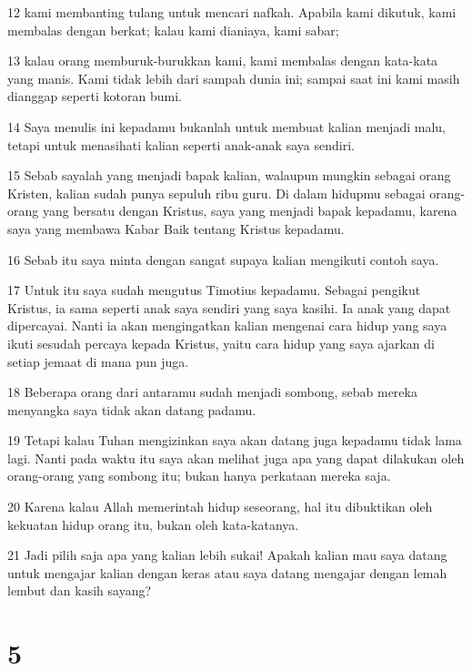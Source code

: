\par 12 kami membanting tulang untuk mencari nafkah. Apabila kami dikutuk, kami membalas dengan berkat; kalau kami dianiaya, kami sabar;
\par 13 kalau orang memburuk-burukkan kami, kami membalas dengan kata-kata yang manis. Kami tidak lebih dari sampah dunia ini; sampai saat ini kami masih dianggap seperti kotoran bumi.
\par 14 Saya menulis ini kepadamu bukanlah untuk membuat kalian menjadi malu, tetapi untuk menasihati kalian seperti anak-anak saya sendiri.
\par 15 Sebab sayalah yang menjadi bapak kalian, walaupun mungkin sebagai orang Kristen, kalian sudah punya sepuluh ribu guru. Di dalam hidupmu sebagai orang-orang yang bersatu dengan Kristus, saya yang menjadi bapak kepadamu, karena saya yang membawa Kabar Baik tentang Kristus kepadamu.
\par 16 Sebab itu saya minta dengan sangat supaya kalian mengikuti contoh saya.
\par 17 Untuk itu saya sudah mengutus Timotius kepadamu. Sebagai pengikut Kristus, ia sama seperti anak saya sendiri yang saya kasihi. Ia anak yang dapat dipercayai. Nanti ia akan mengingatkan kalian mengenai cara hidup yang saya ikuti sesudah percaya kepada Kristus, yaitu cara hidup yang saya ajarkan di setiap jemaat di mana pun juga.
\par 18 Beberapa orang dari antaramu sudah menjadi sombong, sebab mereka menyangka saya tidak akan datang padamu.
\par 19 Tetapi kalau Tuhan mengizinkan saya akan datang juga kepadamu tidak lama lagi. Nanti pada waktu itu saya akan melihat juga apa yang dapat dilakukan oleh orang-orang yang sombong itu; bukan hanya perkataan mereka saja.
\par 20 Karena kalau Allah memerintah hidup seseorang, hal itu dibuktikan oleh kekuatan hidup orang itu, bukan oleh kata-katanya.
\par 21 Jadi pilih saja apa yang kalian lebih sukai! Apakah kalian mau saya datang untuk mengajar kalian dengan keras atau saya datang mengajar dengan lemah lembut dan kasih sayang?

\chapter{5}

